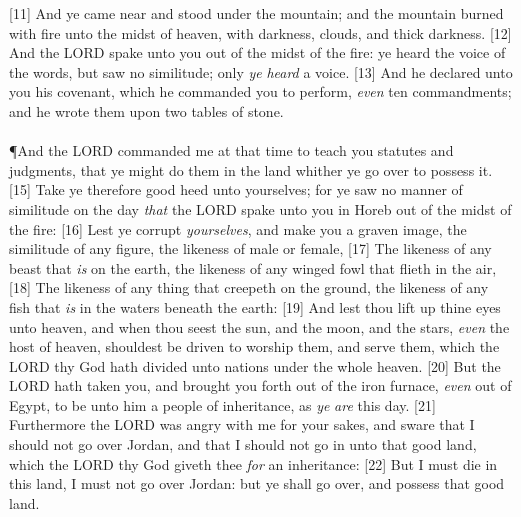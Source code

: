 [11] \textcolor[cmyk]{0.99998,1,0,0}{And ye came near and stood under the mountain; and the mountain burned with fire unto the midst of heaven, with darkness, clouds, and thick darkness.}
[12] \textcolor[cmyk]{0.99998,1,0,0}{And the LORD spake unto you out of the midst of the fire: ye heard the voice of the words, but saw no similitude; only \emph{ye} \emph{heard} a voice.}
[13] \textcolor[cmyk]{0.99998,1,0,0}{And he declared unto you his   {covenant}, which he   {commanded} you to perform, \emph{even} ten   {commandments}; and he wrote them upon two tables of stone.}\\
\\
\P \textcolor[cmyk]{0.99998,1,0,0}{And the LORD   {commanded} me at that time to teach you statutes and judgments, that ye might do them in the land whither ye go over to possess it.}
[15] \textcolor[cmyk]{0.99998,1,0,0}{Take ye therefore good heed unto yourselves; for ye saw no manner of similitude on the day \emph{that} the LORD spake unto you in Horeb out of the midst of the fire:}
[16] \textcolor[cmyk]{0.99998,1,0,0}{Lest ye   {corrupt} \emph{yourselves}, and make you a graven image, the similitude of any figure, the likeness of male or female,}
[17] \textcolor[cmyk]{0.99998,1,0,0}{The likeness of any beast that \emph{is} on the earth, the likeness of any winged fowl that flieth in the air,}
[18] \textcolor[cmyk]{0.99998,1,0,0}{The likeness of any thing that creepeth on the ground, the likeness of any fish that \emph{is} in the waters beneath the earth:}
[19] \textcolor[cmyk]{0.99998,1,0,0}{And lest thou lift up thine eyes unto heaven, and when thou seest the sun, and the moon, and the stars, \emph{even}  the host of heaven, shouldest be driven to worship them, and serve them, which the LORD thy God hath divided unto  nations under the whole heaven.}
[20] \textcolor[cmyk]{0.99998,1,0,0}{But the LORD hath taken you, and brought you forth out of the iron furnace, \emph{even} out of Egypt, to be unto him a people of inheritance, as \emph{ye} \emph{are} this day.}
[21] \textcolor[cmyk]{0.99998,1,0,0}{Furthermore the LORD was angry with me for your sakes, and sware that I should not go over Jordan, and that I should not go in unto that good land, which the LORD thy God giveth thee \emph{for} an inheritance:}
[22] \textcolor[cmyk]{0.99998,1,0,0}{But I must die in this land, I must not go over Jordan: but ye shall go over, and possess that good land.}
